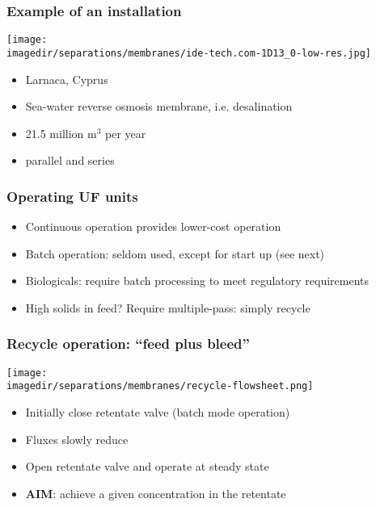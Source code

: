\begin{frame}\frametitle{Example of an installation}
	\texttt{[image: \\imagedir/separations/membranes/ide-tech.com-1D13\_0-low-res.jpg]}
	\begin{itemize}
		\item	Larnaca, Cyprus
		\item	Sea-water reverse osmosis membrane, i.e. desalination
		\item	21.5 million $\text{m}^3$ per year
		\item	parallel and series
	\end{itemize}
\end{frame}

\begin{frame}\frametitle{Operating UF units}
	\begin{itemize}
		\item	Continuous operation provides lower-cost operation
		\item	Batch operation: seldom used, except for start up (see next)
		\item	Biologicals: require batch processing to meet regulatory requirements
		\item	High solids in feed? Require multiple-pass: simply recycle
	\end{itemize}

\end{frame}

\begin{frame}\frametitle{Recycle operation: ``feed plus bleed''}
	\begin{center}
		\texttt{[image: \\imagedir/separations/membranes/recycle-flowsheet.png]}
	\end{center}
	\begin{itemize}
		\item	Initially close retentate valve (batch mode operation)
		\item	Fluxes slowly reduce
		\item	Open retentate valve and operate at steady state
		\item	\textbf{AIM}: achieve a given concentration in the retentate 
	\end{itemize}
\end{frame}

